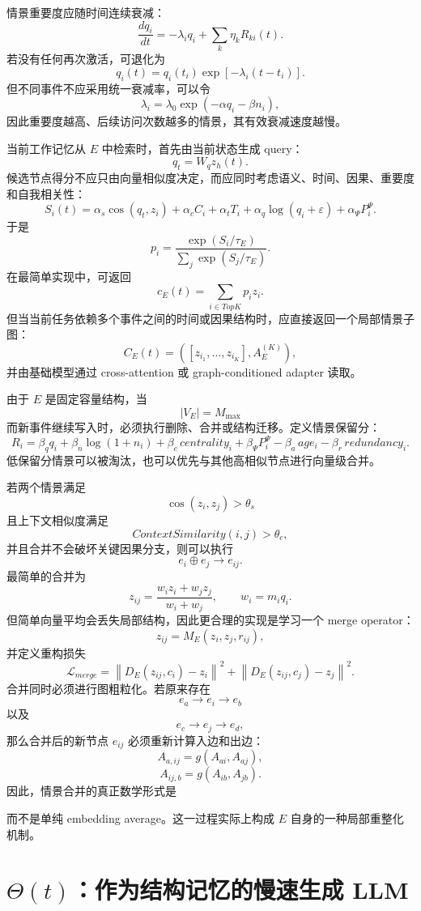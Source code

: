 情景重要度应随时间连续衰减：
\[
\frac{dq_i}{dt}
=
-\lambda_i q_i
+
\sum_k\eta_kR_{ki}(t).
\]
若没有任何再次激活，可退化为
\[
q_i(t)
=
q_i(t_i)
\exp
\left[
-\lambda_i(t-t_i)
\right].
\]
但不同事件不应采用统一衰减率，可以令
\[
\lambda_i
=
\lambda_0
\exp
\left(
-\alpha q_i-\beta n_i
\right),
\]
因此重要度越高、后续访问次数越多的情景，其有效衰减速度越慢。

当前工作记忆从 $E$ 中检索时，首先由当前状态生成 query：
\[
q_t
=
W_qz_h(t).
\]
候选节点得分不应只由向量相似度决定，而应同时考虑语义、时间、因果、重要度和自我相关性：
\[
S_i(t)
=
\alpha_s
\cos(q_t,z_i)
+
\alpha_c C_i
+
\alpha_tT_i
+
\alpha_q\log(q_i+\varepsilon)
+
\alpha_\Psi P_i^\Psi.
\]
于是
\[
p_i
=
\frac{
\exp\left(S_i/\tau_E\right)
}{
\sum_j
\exp\left(S_j/\tau_E\right)
}.
\]
在最简单实现中，可返回
\[
c_E(t)
=
\sum_{i\in TopK}
p_i z_i.
\]
但当当前任务依赖多个事件之间的时间或因果结构时，应直接返回一个局部情景子图：
\[
C_E(t)
=
\left(
[z_{i_1},\ldots,z_{i_K}],
A_E^{(K)}
\right),
\]
并由基础模型通过 cross-attention 或 graph-conditioned adapter 读取。

由于 $E$ 是固定容量结构，当
\[
|V_E|=M_{\max}
\]
而新事件继续写入时，必须执行删除、合并或结构迁移。定义情景保留分：
\[
R_i
=
\beta_q q_i
+
\beta_n\log(1+n_i)
+
\beta_c\,centrality_i
+
\beta_\Psi P_i^\Psi
-
\beta_a\,age_i
-
\beta_r\,redundancy_i.
\]
低保留分情景可以被淘汰，也可以优先与其他高相似节点进行向量级合并。

若两个情景满足
\[
\cos(z_i,z_j)
>
\theta_s
\]
且上下文相似度满足
\[
ContextSimilarity(i,j)
>
\theta_c,
\]
并且合并不会破坏关键因果分支，则可以执行
\[
e_i\oplus e_j
\rightarrow
e_{ij}.
\]
最简单的合并为
\[
z_{ij}
=
\frac{
w_i z_i+w_j z_j
}{
w_i+w_j
},
\qquad
w_i=m_iq_i.
\]
但简单向量平均会丢失局部结构，因此更合理的实现是学习一个 merge operator：
\[
z_{ij}
=
M_E
\left(
z_i,z_j,r_{ij}
\right),
\]
并定义重构损失
\[
\mathcal{L}_{merge}
=
\left\|
D_E(z_{ij},c_i)-z_i
\right\|^2
+
\left\|
D_E(z_{ij},c_j)-z_j
\right\|^2.
\]
合并同时必须进行图粗粒化。若原来存在
\[
e_a\rightarrow e_i\rightarrow e_b
\]
以及
\[
e_c\rightarrow e_j\rightarrow e_d,
\]
那么合并后的新节点 $e_{ij}$ 必须重新计算入边和出边：
\[
A_{a,ij}
=
g(A_{ai},A_{aj}),
\]
\[
A_{ij,b}
=
g(A_{ib},A_{jb}).
\]
因此，情景合并的真正数学形式是
\begin{statementbox}
\centering
{}
\end{statementbox}
而不是单纯 embedding average。这一过程实际上构成 $E$ 自身的一种局部重整化机制。

\section{$\Theta(t)$：作为结构记忆的慢速生成 LLM}

